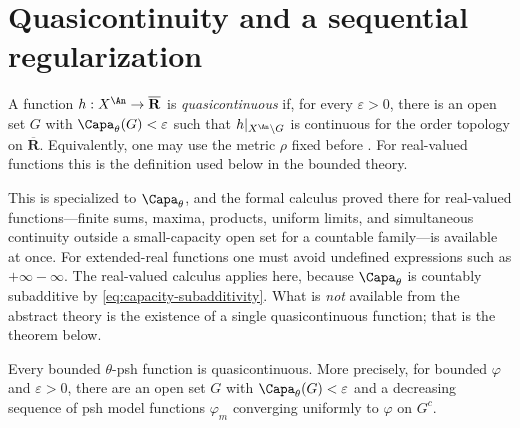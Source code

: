 \section{Quasicontinuity and a sequential regularization}
\label{sec:ch25-quasicontinuity}

\begin{definition}
\label{def:ch25-quasicontinuous}
A function $h:X^{\An}\to\overline{\mathbf R}$ is
\emph{quasicontinuous} if, for every $\varepsilon>0$, there is an open set
$G$ with $\Capa_\theta(G)<\varepsilon$ such that
$h|_{X^{\An}\setminus G}$ is continuous for the order topology on
$\overline{\mathbf R}$.  Equivalently, one may use the metric $\rho$ fixed
before .  For real-valued functions this is
the definition used below in the bounded theory.
\end{definition}

This is  specialized to $\Capa_\theta$, and the
formal calculus proved there for real-valued functions---finite sums,
maxima, products, uniform limits, and simultaneous continuity outside a
small-capacity open set for a countable family---is available at once.
For extended-real functions one must avoid undefined expressions such as
$+\infty-\infty$.  The real-valued calculus applies here, because $\Capa_\theta$ is countably
subadditive by \eqref{eq:capacity-subadditivity}.  What is \emph{not}
available from the abstract theory is the existence of a single
quasicontinuous function; that is the theorem below.

\begin{theorem}
\label{thm:bounded-quasicontinuity}
Every bounded $\theta$-psh function is quasicontinuous. More precisely,
for bounded $\varphi$ and $\varepsilon>0$, there are an open set $G$
with $\Capa_\theta(G)<\varepsilon$ and a decreasing sequence of psh model
functions $\varphi_m$ converging uniformly to $\varphi$ on $G^c$.
\end{theorem}

